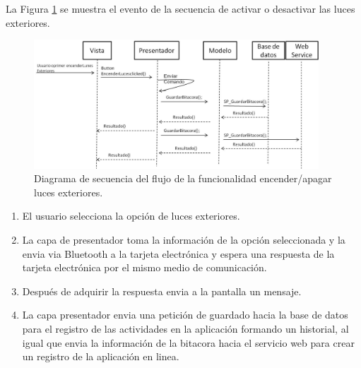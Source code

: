 La Figura \ref{ds9} se muestra el evento de la secuencia de activar o desactivar las luces exteriores.\\
\begin{figure}[H]
\centering
\includegraphics[width=0.95\textwidth]{metodologia/DSEncenderLucesExteriores.jpg}
\caption{Diagrama de secuencia del flujo de la funcionalidad encender/apagar luces exteriores.}
\label{ds9}
\end{figure}
%
 \begin{enumerate}
\item El usuario selecciona la opción de luces exteriores.
\item La capa de presentador toma la información de la opción seleccionada y la envia via Bluetooth a la tarjeta electrónica y espera una respuesta de la tarjeta electrónica por el mismo medio de comunicación.
\item Después de adquirir la respuesta envia a la pantalla un mensaje.
\item La capa presentador envia una petición de guardado hacia la base de datos para el registro de las actividades en la aplicación formando un historial, al igual que envia la información de la bitacora hacia el servicio web para crear un registro de la aplicación en linea.
\end{enumerate}



